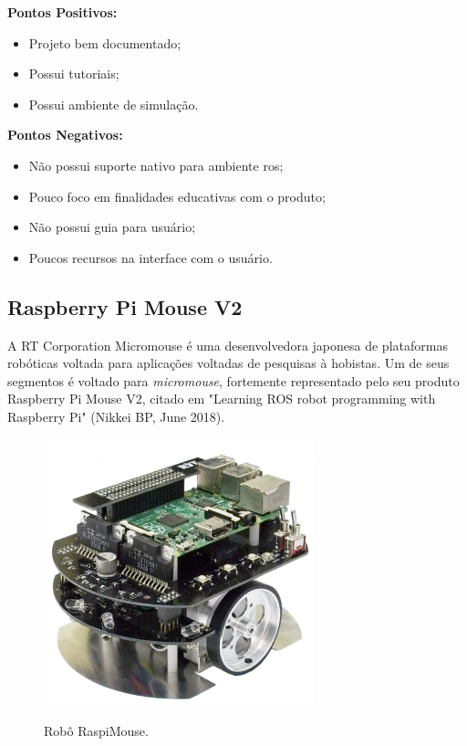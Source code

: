 \textbf{Pontos Positivos:}
\begin{itemize}
	\item Projeto bem documentado;
	\item Possui tutoriais;
	\item Possui ambiente de simulação.
\end{itemize}

\textbf{Pontos Negativos:}
\begin{itemize}
	\item Não possui suporte nativo para ambiente \gls*{ros};
	\item Pouco foco em finalidades educativas com o produto;
	\item Não possui guia para usuário;
	\item Poucos recursos na interface com o usuário.
\end{itemize}

\subsection{Raspberry Pi Mouse V2}
\hspace{0.5cm}A RT Corporation Micromouse é uma desenvolvedora japonesa de plataformas robóticas voltada para aplicações  voltadas de pesquisas à hobistas. Um de seus segmentos é voltado para \textit{micromouse}, fortemente representado pelo seu produto Raspberry Pi Mouse V2, citado em "Learning ROS robot programming with Raspberry Pi" (Nikkei BP, June 2018).

\begin{figure}[H]
	\centering
	\caption{Robô RaspiMouse.}
	\includegraphics[width=0.7\textwidth]
	{Figures/RaspiMouse_model.png}
	\label{fig:RaspiMouse_model}
\end{figure}

